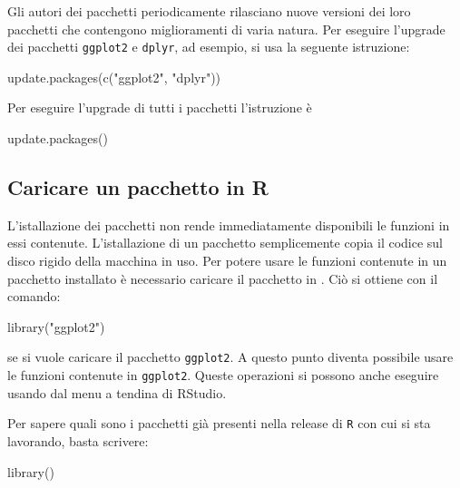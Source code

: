 \documentclass[
  11pt,
]{krantz}
\makeatletter
\newenvironment{Shaded}{\begin{snugshade}}{\end{snugshade}}
\newcommand{\FunctionTok}[1]{\textcolor[rgb]{0,0,0}{#1}}
\newcommand{\NormalTok}[1]{#1}
\newcommand{\StringTok}[1]{\textcolor[rgb]{0.5,0.5,0.5}{#1}}
\newenvironment{kframe}{%
\medskip{}
\setlength{\fboxsep}{.8em}
 \def\at@end@of@kframe{}%
 \ifinner\ifhmode%
  \def\at@end@of@kframe{\end{minipage}}%
  \begin{minipage}{\columnwidth}%
 \fi\fi%
 \def\FrameCommand##1{\hskip\@totalleftmargin \hskip-\fboxsep
 \colorbox{shadecolor}{##1}\hskip-\fboxsep
     \hskip-\linewidth \hskip-\@totalleftmargin \hskip\columnwidth}%
 \MakeFramed {\advance\hsize-\width
   \@totalleftmargin\z@ \linewidth\hsize
   \@setminipage}}%
 {\par\unskip\endMakeFramed%
 \at@end@of@kframe}
\renewenvironment{Shaded}{\begin{kframe}}{\end{kframe}}
\theoremstyle{definition}
\theoremstyle{definition}
\theoremstyle{definition}
\theoremstyle{definition}
\theoremstyle{remark}
\makeatother
\begin{document}
Gli autori dei pacchetti periodicamente rilasciano nuove versioni dei loro pacchetti che contengono miglioramenti di varia natura. Per eseguire l'upgrade dei pacchetti \texttt{ggplot2} e \texttt{dplyr}, ad esempio, si usa la seguente istruzione:

\begin{Shaded}
\begin{Highlighting}[]
\FunctionTok{update.packages}\NormalTok{(}\FunctionTok{c}\NormalTok{(}\StringTok{"ggplot2"}\NormalTok{, }\StringTok{"dplyr"}\NormalTok{))}
\end{Highlighting}
\end{Shaded}

Per eseguire l'upgrade di tutti i pacchetti l'istruzione è

\begin{Shaded}
\begin{Highlighting}[]
\FunctionTok{update.packages}\NormalTok{()}
\end{Highlighting}
\end{Shaded}

\hypertarget{caricare-un-pacchetto-in-r}{%
\subsection{Caricare un pacchetto in R}\label{caricare-un-pacchetto-in-r}}

L'istallazione dei pacchetti non rende immediatamente disponibili le funzioni in essi contenute. L'istallazione di un pacchetto semplicemente copia il codice sul disco rigido della macchina in uso. Per potere usare le funzioni contenute in un pacchetto installato è necessario caricare il pacchetto in . Ciò si ottiene con il comando:

\begin{Shaded}
\begin{Highlighting}[]
\FunctionTok{library}\NormalTok{(}\StringTok{"ggplot2"}\NormalTok{)}
\end{Highlighting}
\end{Shaded}

se si vuole caricare il pacchetto \texttt{ggplot2}. A questo punto diventa possibile usare le funzioni contenute in \texttt{ggplot2}. Queste operazioni si possono anche eseguire usando dal menu a tendina di RStudio.

Per sapere quali sono i pacchetti già presenti nella release di \texttt{R} con cui si sta lavorando, basta scrivere:

\begin{Shaded}
\begin{Highlighting}[]
\FunctionTok{library}\NormalTok{()}
\end{Highlighting}
\end{Shaded}
\end{document}
